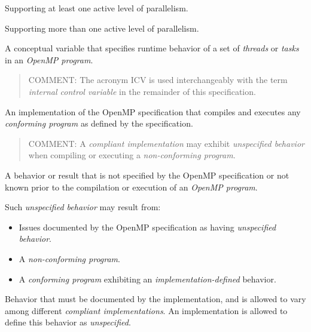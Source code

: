 \glossarydefstart
Supporting at least one active level of parallelism.
\glossarydefend
\bigskip

\glossarydefstart
Supporting more than one active level of parallelism.
\glossarydefend
\bigskip

\glossarydefstart
A conceptual variable that specifies runtime behavior of a set of \emph{threads} 
or \emph{tasks} in an \emph{OpenMP program}.

\begin{quote}
COMMENT: The acronym ICV is used interchangeably with the term 
\emph{internal control variable} in the remainder of this specification.
\end{quote}
\glossarydefend

\glossarydefstart
An implementation of the OpenMP specification that compiles and executes any
\emph{conforming program} as defined by the specification.

\begin{quote}
COMMENT: A \emph{compliant implementation} may exhibit 
\emph{unspecified behavior} when
compiling or executing a \emph{non-conforming program}.
\end{quote}
\glossarydefend

\glossarydefstart
A behavior or result that is not specified by the OpenMP specification or not
known prior to the compilation or execution of an \emph{OpenMP program}.

Such \emph{unspecified behavior} may result from:

\begin{itemize}
\item Issues documented by the OpenMP specification as having 
\emph{unspecified behavior}.

\item A \emph{non-conforming program}.

\item A \emph{conforming program} exhibiting an 
\emph{implementation-defined} behavior.
\end{itemize}
\glossarydefend

\glossarydefstart
Behavior that must be documented by the implementation, and is allowed to vary
among different \emph{compliant implementations}. An implementation is allowed to
define this behavior as \emph{unspecified}.

